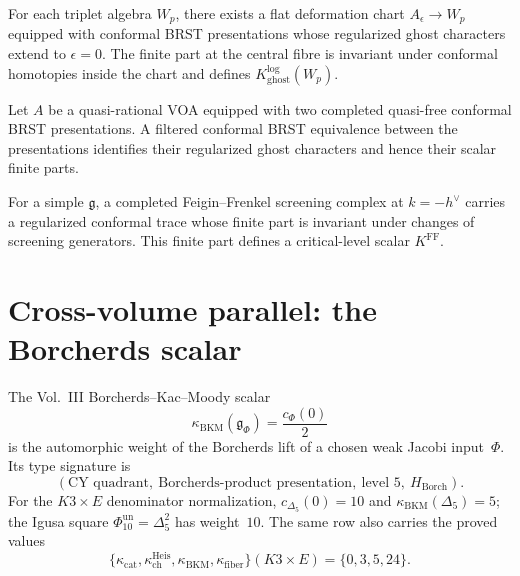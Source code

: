 \begin{conjecture}
\label{conj:K-logarithmic}
\ClaimStatusConjectured
For each triplet algebra $W_p$, there exists a flat deformation chart
$A_\epsilon\to W_p$ equipped with conformal BRST presentations whose
regularized ghost characters extend to $\epsilon=0$.  The finite part
at the central fibre is invariant under conformal homotopies inside the
chart and defines $K_{\mathrm{ghost}}^{\log}(W_p)$.
\end{conjecture}

\begin{conjecture}
\label{conj:K-quasi-rational}
\ClaimStatusConjectured
Let $A$ be a quasi-rational VOA equipped with two completed quasi-free
conformal BRST presentations.  A filtered conformal BRST equivalence
between the presentations identifies their regularized ghost
characters and hence their scalar finite parts.
\end{conjecture}

\begin{conjecture}
\label{conj:K-critical}
\ClaimStatusConjectured
For a simple $\mathfrak g$, a completed Feigin--Frenkel screening
complex at $k=-h^\vee$ carries a regularized conformal trace whose
finite part is invariant under changes of screening generators.  This
finite part defines a critical-level scalar $K^{\mathrm{FF}}$.
\end{conjecture}

\section{Cross-volume parallel: the Borcherds scalar}
\label{sec:conductor-cross-volume}

The Vol.~III Borcherds--Kac--Moody scalar
\[
\kappa_{\mathrm{BKM}}(\mathfrak g_\Phi)=\frac{c_\Phi(0)}2
\]
is the automorphic weight of the Borcherds lift of a chosen weak Jacobi
input~$\Phi$.  Its type signature is
\[
(\text{CY quadrant},\ \text{Borcherds-product presentation},\
 \text{level }5,\ H_{\mathrm{Borch}}).
\]
For the $K3\times E$ denominator normalization,
$c_{\Delta_5}(0)=10$ and
$\kappa_{\mathrm{BKM}}(\Delta_5)=5$; the Igusa square
$\Phi_{10}^{\mathrm{un}}=\Delta_5^2$ has weight~$10$.  The same row
also carries the proved values
\[
\{\kappa_{\mathrm{cat}},\kappa_{\mathrm{ch}}^{\mathrm{Heis}},
\kappa_{\mathrm{BKM}},\kappa_{\mathrm{fiber}}\}(K3\times E)
=\{0,3,5,24\}.
\]


